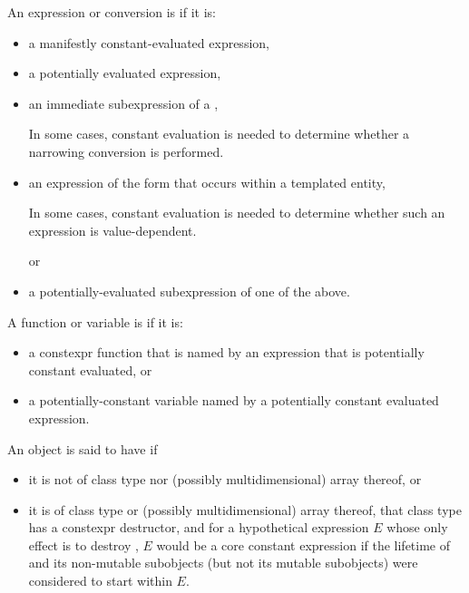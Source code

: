\pnum
{}%
An expression or conversion is 
if it is:
\begin{itemize}
\item
a manifestly constant-evaluated expression,

\item
a potentially evaluated expression,

\item
an immediate subexpression of a ,
\begin{footnote}
In some cases, constant evaluation is needed to determine whether a narrowing conversion is performed.
\end{footnote}

\item
an expression of the form \tcode{\&} 
that occurs within a templated entity,
\begin{footnote}
In some cases, constant evaluation is needed to determine whether such an expression is value-dependent.
\end{footnote}
or

\item
a potentially-evaluated subexpression of one of the above.
\end{itemize}

%
%
A function or variable is
if it is:
\begin{itemize}
\item
a constexpr function that is named by an expression
that is potentially constant evaluated, or

\item
a potentially-constant variable named by a potentially constant evaluated expression.
\end{itemize}

\pnum
An object  is said to have  if
\begin{itemize}
\item
  it is not of class type nor (possibly multidimensional) array thereof, or
\item
  it is of class type or (possibly multidimensional) array thereof,
  that class type has a constexpr destructor, and
  for a hypothetical expression $E$
  whose only effect is to destroy ,
  $E$ would be a core constant expression
  if the lifetime of  and its non-mutable subobjects
  (but not its mutable subobjects) were considered to start within $E$.
\end{itemize}

